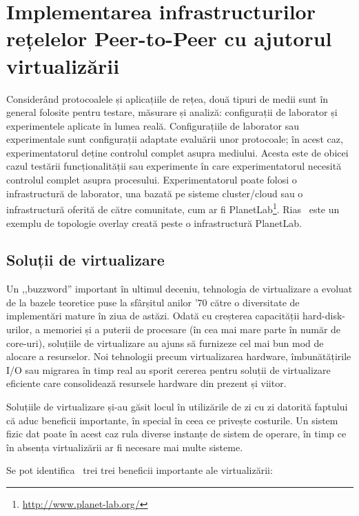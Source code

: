 
\chapter{Implementarea infrastructurilor rețelelor Peer-to-Peer cu ajutorul
virtualizării}
\label{chapter:virt-infra}

Considerând protocoalele și aplicațiile de rețea, două tipuri de medii
sunt în general folosite pentru testare, măsurare și analiză: configurații
de laborator și experimentele aplicate în lumea reală. Configurațiile
de laborator sau experimentale sunt configurații adaptate evaluării
unor protocoale; în acest caz, experimentatorul deține controlul
complet asupra mediului. Acesta este de obicei cazul testării
funcționalității sau experimente în care experimentatorul necesită controlul
complet asupra procesului. Experimentatorul poate folosi o infrastructură
de laborator, una bazată pe sisteme cluster/cloud sau o infrastructură
oferită de către comunitate, cum ar fi 
PlanetLab\footnote{\url{http://www.planet-lab.org/}}. Rias~\cite{rias} este
un exemplu de topologie overlay creată peste o infrastructură PlanetLab.

\section{Soluții de virtualizare}
\label{sec:virt-infra:openvz}

Un ,,buzzword'' important în ultimul deceniu, tehnologia de virtualizare
a evoluat de la bazele teoretice puse la sfârșitul anilor '70 către o
diversitate de implementări mature în ziua de astăzi. Odată cu creșterea
capacității hard-disk-urilor, a memoriei și a puterii de procesare
(în cea mai mare parte în număr de core-uri), soluțiile de virtualizare
au ajuns să furnizeze cel mai bun mod de alocare a resurselor. Noi
tehnologii precum virtualizarea hardware, îmbunătățirile I/O sau migrarea
în timp real au sporit cererea pentru soluții de virtualizare eficiente
care consolidează resursele hardware din prezent și viitor.

Soluțiile de virtualizare și-au găsit locul în utilizările de zi cu zi
datorită faptului că aduc beneficii importante, în special în ceea ce
privește costurile. Un sistem fizic dat poate în acest caz rula diverse
instanțe de sistem de operare, în timp ce în absența virtualizării ar fi
necesare mai multe sisteme.

Se pot identifica~\cite{best-damn-virt} trei trei beneficii importante ale
virtualizării:

